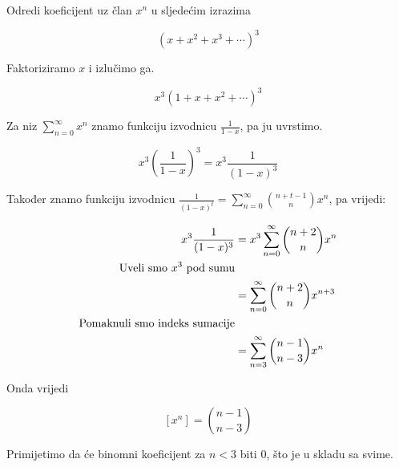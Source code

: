 \documentclass[exam.tex]{subfiles}
\begin{document}
	Odredi koeficijent uz član \( x^n \) u sljedećim izrazima
	
	\[ (x + x^2 + x^3 + \cdots)^3 \]
	
	Faktoriziramo \( x \) i izlučimo ga.
	
	\[ x^3 (1 + x + x^2 + \cdots)^3 \]
	
	Za niz \( \sum\limits^\infty_{n=0} x^n \) znamo funkciju izvodnicu \( \frac{1}{1 - x} \), pa ju uvrstimo.
	
	\[ x^3 \left ( \frac{1}{1 - x} \right )^3 = x^3 \frac{1}{(1 - x)^3} \]
	
	Također znamo funkciju izvodnicu \( \frac{1}{(1 - x)^t} = \sum\limits^\infty_{n=0} \binom{n + t - 1}{n} x^n \), pa vrijedi:
	
	\begin{align*}
		x^3 \frac{1}{(1 - x)^3} &= x^3 \sum\limits^\infty_{n=0} \binom{n + 2}{n} x^n \\
		\text{Uveli smo \( x^3 \) pod sumu} \\
		&= \sum\limits^\infty_{n=0} \binom{n + 2}{n} x^{n + 3} \\
		\text{Pomaknuli smo indeks sumacije} \\
		&= \sum\limits^\infty_{n=3} \binom{n - 1}{n - 3} x^n
	\end{align*}
	
	Onda vrijedi
	
	\[ [x^n] = \binom{n - 1}{n - 3} \]
	
	Primijetimo da će binomni koeficijent za \( n < 3 \) biti 0, što je u skladu sa svime.
\end{document}
